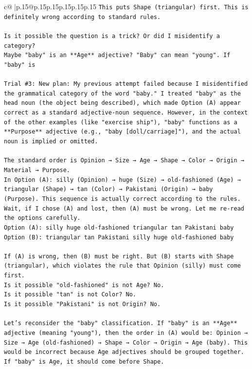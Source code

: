 \documentclass{article}
\begin{document}
{\begin{supertabular}{c@{$\;$}|p{.15\linewidth}@{}p{.15\linewidth}p{.15\linewidth}p{.15\linewidth}p{.15\linewidth}p{.15\linewidth}}
{{{\texttt{This puts Shape (triangular) first. This is definitely wrong according to standard rules.} \\
\\ 
\texttt{Is it possible the question is a trick? Or did I misidentify a category?} \\
\texttt{Maybe "baby" is an **Age** adjective? "Baby" can mean "young". If "baby" is} \\
\\ 
\texttt{Trial \#3: New plan: My previous attempt failed because I misidentified the grammatical category of the word "baby." I treated "baby" as the head noun (the object being described), which made Option (A) appear correct as a standard adjective{-}noun sequence. However, in the context of the other examples (like "exercise ship"), "baby" functions as a **Purpose** adjective (e.g., "baby {[}doll/carriage{]}"), and the actual noun is implied or omitted.} \\
\\ 
\texttt{The standard order is Opinion → Size → Age → Shape → Color → Origin → Material → Purpose.} \\
\texttt{In Option (A): silly (Opinion) → huge (Size) → old{-}fashioned (Age) → triangular (Shape) → tan (Color) → Pakistani (Origin) → baby (Purpose). This sequence is actually correct according to the rules.} \\
\texttt{Wait, if I chose (A) and lost, then (A) must be wrong. Let me re{-}read the options carefully.} \\
\texttt{Option (A): silly huge old{-}fashioned triangular tan Pakistani baby} \\
\texttt{Option (B): triangular tan Pakistani silly huge old{-}fashioned baby} \\
\\ 
\texttt{If (A) is wrong, then (B) must be right. But (B) starts with Shape (triangular), which violates the rule that Opinion (silly) must come first.} \\
\texttt{Is it possible "old{-}fashioned" is not Age? No.} \\
\texttt{Is it possible "tan" is not Color? No.} \\
\texttt{Is it possible "Pakistani" is not Origin? No.} \\
\\ 
\texttt{Let's reconsider the "baby" classification. If "baby" is an **Age** adjective (meaning "young"), then the order in (A) would be: Opinion → Size → Age (old{-}fashioned) → Shape → Color → Origin → Age (baby). This would be incorrect because Age adjectives should be grouped together. If "baby" is Age, it should come before Shape.} \\
}}}
\end{supertabular}}
\end{document}
